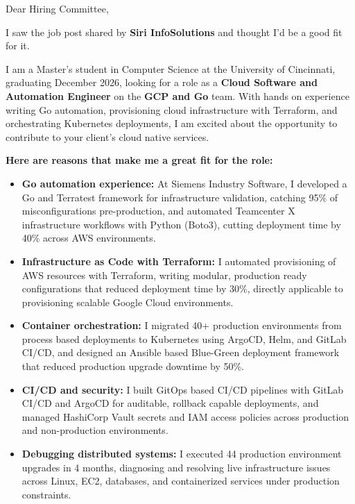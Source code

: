 \documentclass[11pt]{letter}
\date{}
\begin{document}
\begin{letter}{}

\opening{Dear Hiring Committee,}

I saw the job post shared by \textbf{Siri InfoSolutions} and thought I'd be a good fit for it.

I am a Master's student in Computer Science at the University of Cincinnati, graduating December 2026, looking for a role as a \textbf{Cloud Software and Automation Engineer} on the \textbf{GCP and Go} team. With hands on experience writing Go automation, provisioning cloud infrastructure with Terraform, and orchestrating Kubernetes deployments, I am excited about the opportunity to contribute to your client's cloud native services.

\textbf{Here are reasons that make me a great fit for the role:}

\begin{itemize}[leftmargin=*, itemsep=0.45em]
    \item \textbf{Go automation experience:} At Siemens Industry Software, I developed a Go and Terratest framework for infrastructure validation, catching 95\% of misconfigurations pre-production, and automated Teamcenter X infrastructure workflows with Python (Boto3), cutting deployment time by 40\% across AWS environments.

    \item \textbf{Infrastructure as Code with Terraform:} I automated provisioning of AWS resources with Terraform, writing modular, production ready configurations that reduced deployment time by 30\%, directly applicable to provisioning scalable Google Cloud environments.

    \item \textbf{Container orchestration:} I migrated 40+ production environments from process based deployments to Kubernetes using ArgoCD, Helm, and GitLab CI/CD, and designed an Ansible based Blue-Green deployment framework that reduced production upgrade downtime by 50\%.

    \item \textbf{CI/CD and security:} I built GitOps based CI/CD pipelines with GitLab CI/CD and ArgoCD for auditable, rollback capable deployments, and managed HashiCorp Vault secrets and IAM access policies across production and non-production environments.

    \item \textbf{Debugging distributed systems:} I executed 44 production environment upgrades in 4 months, diagnosing and resolving live infrastructure issues across Linux, EC2, databases, and containerized services under production constraints.
\end{itemize}


\end{letter}
\end{document}
